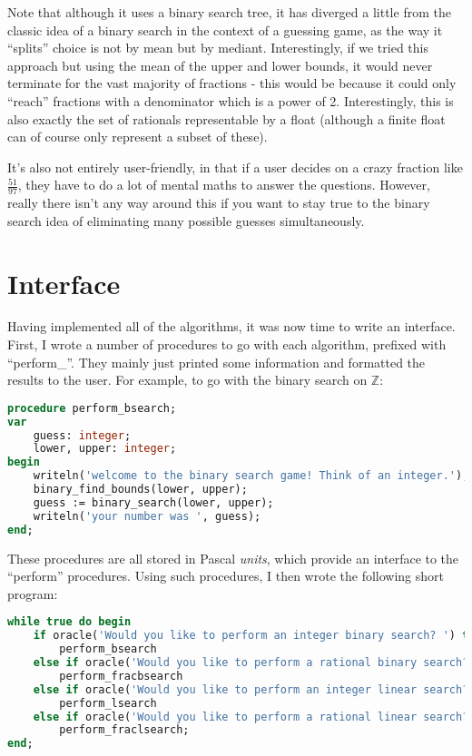 \documentclass[fleqn,a4paper,11pt]{article}
\begin{document}
    Note that although it uses a binary search tree, it has diverged a little
    from the classic idea of a binary search in the context of a guessing game,
    as the way it ``splits'' choice is not by mean but by mediant.
    Interestingly, if we tried this approach but using the mean of the upper and
    lower bounds, it would never terminate for the vast majority of fractions -
    this would be because it could only ``reach'' fractions with a denominator
    which is a power of 2. Interestingly, this is also exactly the set of
    rationals representable by a float (although a finite float can of course
    only represent a subset of these).

    It's also not entirely user-friendly, in that if a user decides on a crazy
    fraction like $\frac{51}{97}$, they have to do a lot of mental maths to
    answer the questions. However, really there isn't any way around this if you
    want to stay true to the binary search idea of eliminating many possible
    guesses simultaneously.

    \section{Interface}

    Having implemented all of the algorithms, it was now time to write an
    interface. First, I wrote a number of procedures to go with each algorithm,
    prefixed with ``perform\_''. They mainly just printed some information and
    formatted the results to the user. For example, to go with the binary search
    on $\mathbb{Z}$:

\begin{lstlisting}[language=Pascal, caption=Binary search on $\mathbb{Z}$ wrapper procedure]
procedure perform_bsearch;
var
    guess: integer;
    lower, upper: integer;
begin
    writeln('welcome to the binary search game! Think of an integer.');
    binary_find_bounds(lower, upper);
    guess := binary_search(lower, upper);
    writeln('your number was ', guess);
end;
\end{lstlisting}

    These procedures are all stored in Pascal \emph{units}, which provide an
    interface to the ``perform'' procedures. Using such procedures, I then wrote
    the following short program:

\begin{lstlisting}[language=Pascal, caption=Main interface loop]
while true do begin
    if oracle('Would you like to perform an integer binary search? ') then
        perform_bsearch
    else if oracle('Would you like to perform a rational binary search? ') then
        perform_fracbsearch
    else if oracle('Would you like to perform an integer linear search? ') then
        perform_lsearch
    else if oracle('Would you like to perform a rational linear search? ') then
        perform_fraclsearch;
end;
\end{lstlisting}
\end{document}
